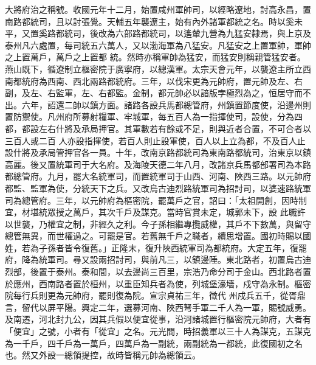 \begin{pinyinscope}
 大將府治之稱號。收國元年十二月，始置咸州軍帥司，以經略遼地，討高永昌，置南路都統司，且以討張覺。天輔五年襲遼主，始有內外諸軍都統之名。時以奚未平，又置奚路都統司，後改為六部路都統司，以遙輦九營為九猛安隸焉，與上京及泰州凡六處置，每司統五六萬人，又以渤海軍為八猛安。凡猛安之上置軍帥，軍帥之上置萬戶，萬戶之上置都
 統。然時亦稱軍帥為猛安，而猛安則稱親管猛安者。燕山既下，循遼制立樞密院于廣寧府，以總漢軍。太宗天會元年，以襲遼主所立西南都統府為西南、西北兩路都統府。三年，以伐宋更為元帥府，置元帥及左、右副，及左、右監軍，左、右都監。金制，都元帥必以諳版孛極烈為之，恒居守而不出。六年，詔還二帥以鎮方面。諸路各設兵馬都總管府，州鎮置節度使，沿邊州則置防禦使。凡州府所募射糧軍、牢城軍，每五百人為一指揮使司，設使，分為四都，都設左右什將及承局押官。其軍數若有餘或不足，則與近者合置，不可合者以三百人或二百
 人亦設指揮使，若百人則止設軍使，百人以上立為都，不及百人止設什將及承局管押官各一員。十年，改南京路都統司為東南路都統司，治東京以鎮高麗。後又置統軍司于大名府。及海陵天德二年八月，改諸京兵馬都部署司為本路都總管府。九月，罷大名統軍司，而置統軍司于山西、河南、陜西三路。以元帥府都監、監軍為使，分統天下之兵。又改烏古迪烈路統軍司為招討司，以婆速路統軍司為總管府。三年，以元帥府為樞密院，罷萬戶之官，詔曰：「太祖開創，因時制宜，材堪統眾授之萬戶，其次千戶及謀克。當時官賞未定，城郭未下，設
 此職許以世襲，乃權宜之制，非經久之利。今子孫相繼專攬威權，其戶不下數萬，與留守總管無異，而世權過之。可罷是官。若舊無千戶之職者，續思增置。國初時賜以國姓，若為子孫者皆令復舊。」正隆末，復升陜西統軍司為都統府。大定五年，復罷府，降為統軍司。尋又設兩招討司，與前凡三，以鎮邊陲。東北路者，初置烏古迪烈部，後置于泰州。泰和間，以去邊尚三百里，宗浩乃命分司于金山。西北路者置於應州，西南路者置於桓州，以重臣知兵者為使，列城堡濠墻，戍守為永制。樞密院每行兵則更為元帥府，罷則復為院。宣宗貞祐三年，徵代
 州戍兵五千，從胥鼎言，留代以屏平陽。興定二年，選募河南、陜西弩手軍二千人為一軍，賜號威勇。及南遷，河北封九公，因其兵假以便宜從事，沿河諸城置行樞密院元帥府，大者有「便宜」之號，小者有「從宜」之名。元光間，時招義軍以三十人為謀克，五謀克為一千戶，四千戶為一萬戶，四萬戶為一副統，兩副統為一都統，此復國初之名也。然又外設一總領提控，故時皆稱元帥為總領云。




\end{pinyinscope}
